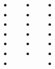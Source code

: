 \documentclass[20pt, a1paper ]{tikzposter}
\begin{document}
\begin{columns}

			{				
			\setlength{\leftmargini}{9em}			
			\setlength{\labelsep}{1em} %

			\begin{LARGE}
			\begin{itemize}
			\item 
			\item 
			\item 
			\item 
			\item 
			\item 
			\item 

			\end{itemize}
			\end{LARGE}
		}



			{				
			\setlength{\leftmargini}{9em}			
			\setlength{\labelsep}{1em} %

			\begin{LARGE}
			\begin{itemize}
			\item 
			\item 
			\item 
			\item 
			\item 
			\item 
			\end{itemize}
			\end{LARGE}
		}


			{				
			\setlength{\leftmargini}{9em}			
			\setlength{\labelsep}{1em} %

			\begin{LARGE}
			\begin{itemize}
			\item 
			\item 
			\item 
			\item 
			\item 
			\item 
			\item 


\end{itemize}
\end{LARGE}}
\end{columns}
\end{document}
